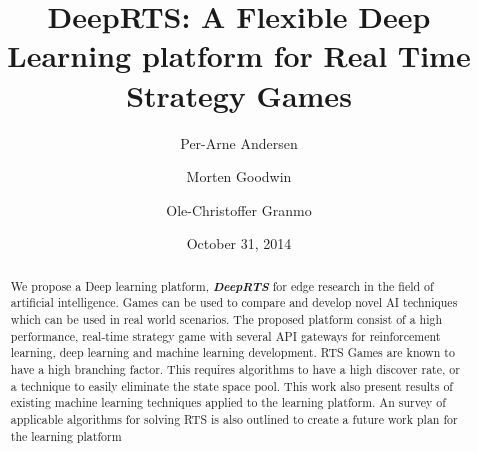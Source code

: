 \documentclass[fleqn,10pt]{article} %
\title{DeepRTS: A Flexible Deep Learning platform for Real Time Strategy Games}
\date{October 31, 2014}
\author{Per-Arne Andersen \and Morten Goodwin \and Ole-Christoffer Granmo}
\begin{document}
\flushbottom %

\maketitle %

\begin{abstract}
We propose a Deep learning platform, \textit{\textbf{DeepRTS}} for edge research in the field of artificial intelligence. Games can be used to compare and develop novel AI techniques which can be used in real world scenarios. The proposed platform consist of a high performance, real-time strategy game with several API gateways for reinforcement learning, deep learning and machine learning development. RTS Games are known to have a high branching factor. This requires algorithms to have a high discover rate, or a technique to easily eliminate the state space pool. This work also present results of existing machine learning techniques applied to the learning platform. An survey of applicable algorithms for solving RTS is also outlined to create a future work plan for the learning platform
\end{abstract}



\newpage

\tableofcontents %

\thispagestyle{empty} %

\end{document}

